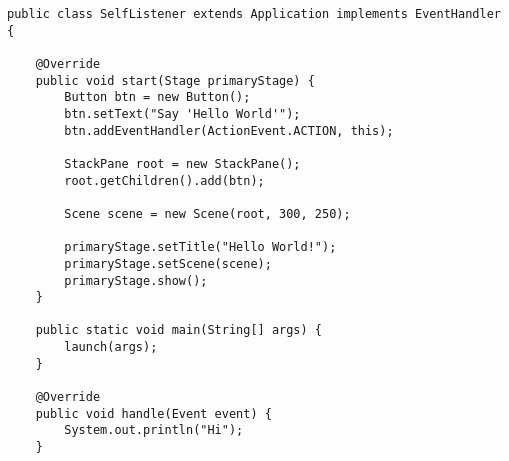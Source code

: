 \documentclass[10pt,a4paper]{article}
\begin{document}
\begin{verbatim}
public class SelfListener extends Application implements EventHandler {
    
    @Override
    public void start(Stage primaryStage) {
        Button btn = new Button();
        btn.setText("Say 'Hello World'");
        btn.addEventHandler(ActionEvent.ACTION, this);

        StackPane root = new StackPane();
        root.getChildren().add(btn);
        
        Scene scene = new Scene(root, 300, 250);
        
        primaryStage.setTitle("Hello World!");
        primaryStage.setScene(scene);
        primaryStage.show();
    }

    public static void main(String[] args) {
        launch(args);
    }

    @Override
    public void handle(Event event) {
        System.out.println("Hi");
    }

\end{verbatim}
\end{document}
